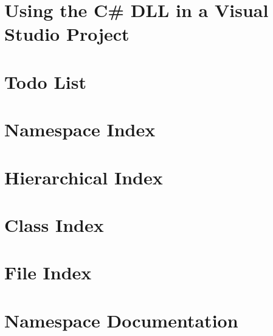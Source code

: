 \let\mypdfximage\pdfximage\def\pdfximage{\immediate\mypdfximage}\documentclass[twoside]{book}
\newcommand{\+}{\discretionary{\mbox{\scriptsize$\hookleftarrow$}}{}{}}
\begin{document}
\chapter{Using the C\# D\+LL in a Visual Studio Project}
\label{_v_s_tutorial}

\chapter{Todo List}
\label{todo}

\chapter{Namespace Index}

\chapter{Hierarchical Index}

\chapter{Class Index}

\chapter{File Index}

\chapter{Namespace Documentation}













\end{document}
